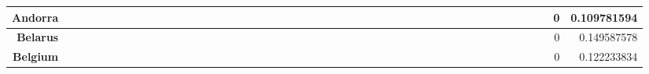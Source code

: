\documentclass[a4paper,11pt]{report}
\begin{document}
\begin{appendices}
\begin{landscape}
\begin{longtable}{r|r|r|r|r|r|r|r|r|r|r|r|r|r|r|r|r|r|r|r|r|r|r|r|r|r|r|r|r|r|r|r|r|r|r|r|r|r|r|r|r|r|r|r|r|r|r|}
\multicolumn{1}{|r|}{\textbf{Andorra}}               &                  &                  &                  &                     &                  &                  &                                &                   &                  &                 &                         &                  &                  &                           &                  &                 &                  &                 &                  &                  &                  &                 &                 &                    &                &                  &                     &                 &                 &                   &                  &                 &                 &                   &                   &                &                 &                      &                          &                 &                  &                         &                 &                & 0                        & 0.109781594        \\ \hline
\multicolumn{1}{|r|}{\textbf{Belarus}}               &                  &                  &                  &                     &                  &                  &                                &                   &                  &                 &                         &                  &                  &                           &                  &                 &                  &                 &                  &                  &                  &                 &                 &                    &                &                  &                     &                 &                 &                   &                  &                 &                 &                   &                   &                &                 &                      &                          &                 &                  &                         &                 &                & 0                        & 0.149587578        \\ \hline
\multicolumn{1}{|r|}{\textbf{Belgium}}               &                  &                  &                  &                     &                  &                  &                                &                   &                  &                 &                         &                  &                  &                           &                  &                 &                  &                 &                  &                  &                  &                 &                 &                    &                &                  &                     &                 &                 &                   &                  &                 &                 &                   &                   &                &                 &                      &                          &                 &                  &                         &                 &                & 0                        & 0.122233834        \\ \hline

\end{longtable}
\end{landscape}
\end{appendices}
\end{document}
